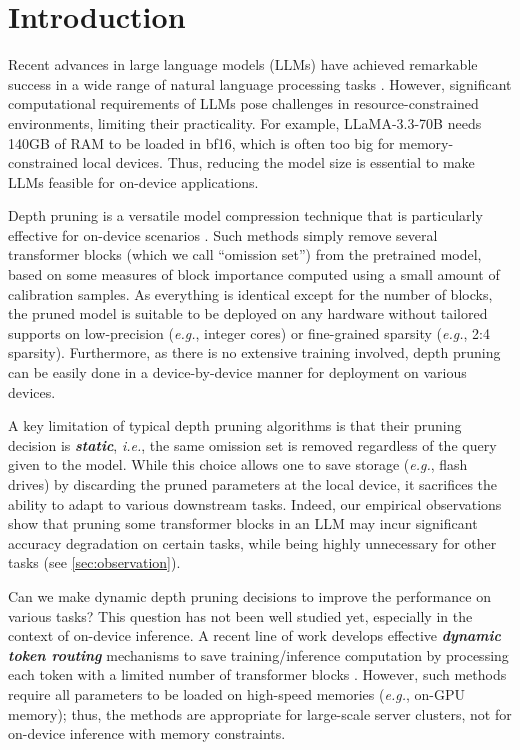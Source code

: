 \section{Introduction}


Recent advances in large language models (LLMs) have achieved remarkable success in a wide range of natural language processing tasks \cite{brown2020language,touvron2023llama,dubey2024llama}. However, significant computational requirements of LLMs pose challenges in resource-constrained environments, limiting their practicality. For example, LLaMA-3.3-70B needs 140GB of RAM to be loaded in bf16, which is often too big for memory-constrained local devices. Thus, reducing the model size is essential to make LLMs feasible for on-device applications.

Depth pruning is a versatile model compression technique that is particularly effective for on-device scenarios \cite{songsleb,kim2024shortened}. Such methods simply remove several transformer blocks (which we call ``omission set'') from the pretrained model, based on some measures of block importance computed using a small amount of calibration samples. As everything is identical except for the number of blocks, the pruned model is suitable to be deployed on any hardware without tailored supports on low-precision (\textit{e.g.}, integer cores) or fine-grained sparsity (\textit{e.g.}, 2:4 sparsity). Furthermore, as there is no extensive training involved, depth pruning can be easily done in a device-by-device manner for deployment on various devices.



A key limitation of typical depth pruning algorithms is that their pruning decision is \textbf{\textit{static}}, \textit{i.e.}, the same omission set is removed regardless of the query given to the model. While this choice allows one to save storage (\textit{e.g.}, flash drives) by discarding the pruned parameters at the local device, it sacrifices the ability to adapt to various downstream tasks. Indeed, our empirical observations show that pruning some transformer blocks in an LLM may incur significant accuracy degradation on certain tasks, while being highly unnecessary for other tasks (see \cref{sec:observation}).


Can we make dynamic depth pruning decisions to improve the performance on various tasks? This question has not been well studied yet, especially in the context of on-device inference. A recent line of work develops effective \textbf{\textit{dynamic token routing}} mechanisms to save training/inference computation by processing each token with a limited number of transformer blocks \cite{raposo2024mixture,wangd}. However, such methods require all parameters to be loaded on high-speed memories (\textit{e.g.}, on-GPU memory); thus, the methods are appropriate for large-scale server clusters, not for on-device inference with memory constraints.


